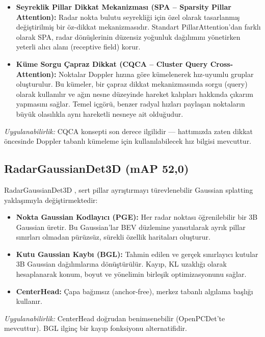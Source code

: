\documentclass[a4paper,11pt]{article}
\begin{document}
\begin{itemize}[nosep]
    \item \textbf{Seyreklik Pillar Dikkat Mekanizması (SPA -- Sparsity Pillar Attention):} Radar nokta bulutu seyrekliği için özel olarak tasarlanmış değiştirilmiş bir öz-dikkat mekanizmasıdır. Standart PillarAttention'dan farklı olarak SPA, radar dönüşlerinin düzensiz yoğunluk dağılımını yönetirken yeterli alıcı alanı (receptive field) korur.
    \item \textbf{Küme Sorgu Çapraz Dikkat (CQCA -- Cluster Query Cross-Attention):} Noktalar Doppler hızına göre kümelenerek hız-uyumlu gruplar oluşturulur. Bu kümeler, bir çapraz dikkat mekanizmasında sorgu (query) olarak kullanılır ve ağın nesne düzeyinde hareket kalıpları hakkında çıkarım yapmasını sağlar. Temel içgörü, benzer radyal hızları paylaşan noktaların büyük olasılıkla aynı hareketli nesneye ait olduğudur.
\end{itemize}

\noindent
\textit{Uygulanabilirlik:} CQCA konsepti son derece ilgilidir --- hattımızda zaten dikkat öncesinde Doppler tabanlı kümeleme için kullanılabilecek hız bilgisi mevcuttur.

\subsection{RadarGaussianDet3D (mAP 52{,}0)}

RadarGaussianDet3D \cite{rgd3d}, sert pillar ayrıştırmayı türevlenebilir Gaussian splatting yaklaşımıyla değiştirmektedir:

\begin{itemize}[nosep]
    \item \textbf{Nokta Gaussian Kodlayıcı (PGE):} Her radar noktası öğrenilebilir bir 3B Gaussian üretir. Bu Gaussian'lar BEV düzlemine yansıtılarak ayrık pillar sınırları olmadan pürüzsüz, sürekli özellik haritaları oluşturur.
    \item \textbf{Kutu Gaussian Kaybı (BGL):} Tahmin edilen ve gerçek sınırlayıcı kutular 3B Gaussian dağılımlarına dönüştürülür. Kayıp, KL uzaklığı olarak hesaplanarak konum, boyut ve yönelimin birleşik optimizasyonunu sağlar.
    \item \textbf{CenterHead:} Çapa bağımsız (anchor-free), merkez tabanlı algılama başlığı kullanır.
\end{itemize}

\noindent
\textit{Uygulanabilirlik:} CenterHead doğrudan benimsenebilir (OpenPCDet'te mevcuttur). BGL ilginç bir kayıp fonksiyonu alternatifidir.
\end{document}
